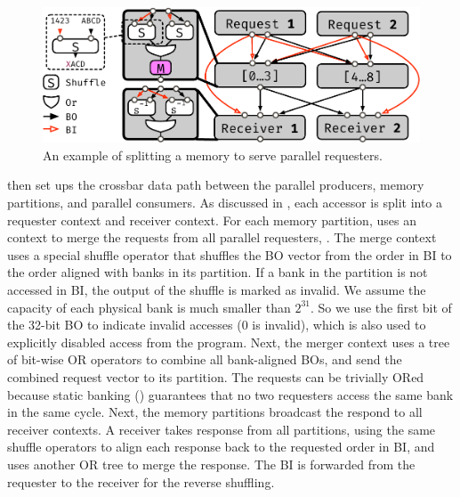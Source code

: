 
\begin{figure}
  \centering
  \includegraphics[width=1\columnwidth]{figs/memsplit.pdf}
  \caption{An example of splitting a memory to serve parallel requesters.}
  \label{fig:memsplit}
\end{figure}

\name{} then set ups the crossbar data path between the parallel producers, memory partitions, and parallel consumers.
As discussed in , each accessor is split into a requester context and receiver context.
For each memory partition, \name{} uses an context to merge the requests from all parallel requesters, .
The merge context uses a special shuffle operator that shuffles the BO vector from the order in BI to the order aligned with banks in its partition.
If a bank in the partition is not accessed in BI, the output of the shuffle is marked as invalid.
We assume the capacity of each physical bank is much smaller than $2^{31}$. 
So we use the first bit of the 32-bit BO to indicate invalid accesses (0 is invalid), which is also used to explicitly disabled access from the program.
Next, the merger context uses a tree of bit-wise OR operators to combine all bank-aligned BOs, and send the combined request vector to its partition.
The requests can be trivially ORed because static banking () guarantees that no two requesters access the same bank in the same cycle.
Next, the memory partitions broadcast the respond to all receiver contexts.
A receiver takes response from all partitions, using the same shuffle operators to align each response back to the requested order in BI, and uses another OR tree to merge the response. 
The BI is forwarded from the requester to the receiver for the reverse shuffling.

